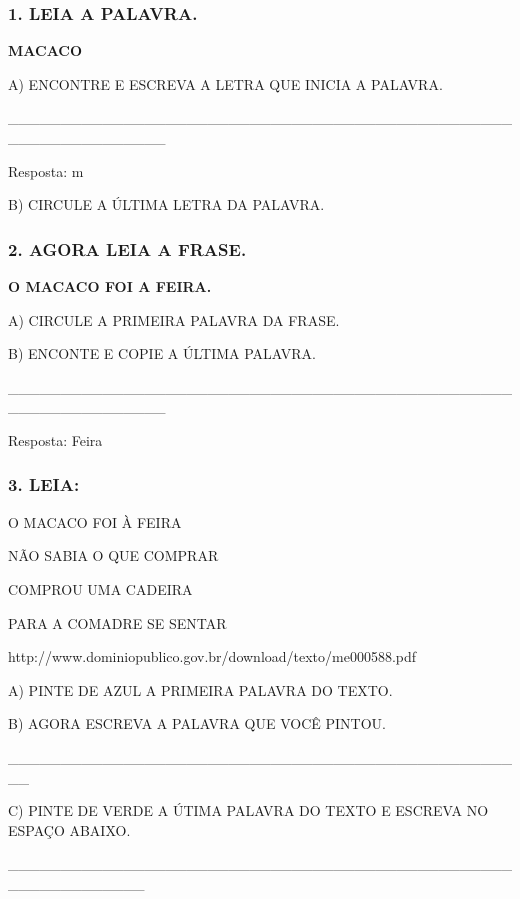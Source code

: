 \subsubsection{1. LEIA A PALAVRA.}\label{leia-a-palavra.}

\textbf{MACACO}

A) ENCONTRE E ESCREVA A LETRA QUE INICIA A PALAVRA.

\_\_\_\_\_\_\_\_\_\_\_\_\_\_\_\_\_\_\_\_\_\_\_\_\_\_\_\_\_\_\_\_\_\_\_\_\_\_\_\_\_\_\_\_\_\_\_\_\_\_\_\_\_\_\_\_\_\_\_\_\_\_\_

Resposta: m

B) CIRCULE A ÚLTIMA LETRA DA PALAVRA.

\subsubsection{2. AGORA LEIA A FRASE.}\label{agora-leia-a-frase.}

\textbf{O MACACO FOI A FEIRA.}

A) CIRCULE A PRIMEIRA PALAVRA DA FRASE.

B) ENCONTE E COPIE A ÚLTIMA PALAVRA.

\_\_\_\_\_\_\_\_\_\_\_\_\_\_\_\_\_\_\_\_\_\_\_\_\_\_\_\_\_\_\_\_\_\_\_\_\_\_\_\_\_\_\_\_\_\_\_\_\_\_\_\_\_\_\_\_\_\_\_\_\_\_\_

Resposta: Feira

\subsubsection{3. LEIA:}\label{leia}

O MACACO FOI À FEIRA

NÃO SABIA O QUE COMPRAR

COMPROU UMA CADEIRA

PARA A COMADRE SE SENTAR

\protect\hypertarget{_heading=h.17dp8vu}{}{}http://www.dominiopublico.gov.br/download/texto/me000588.pdf

A) PINTE DE AZUL A PRIMEIRA PALAVRA DO TEXTO.

B) AGORA ESCREVA A PALAVRA QUE VOCÊ PINTOU.

\_\_\_\_\_\_\_\_\_\_\_\_\_\_\_\_\_\_\_\_\_\_\_\_\_\_\_\_\_\_\_\_\_\_\_\_\_\_\_\_\_\_\_\_\_\_\_\_\_\_

C) PINTE DE VERDE A ÚTIMA PALAVRA DO TEXTO E ESCREVA NO ESPAÇO ABAIXO.

\_\_\_\_\_\_\_\_\_\_\_\_\_\_\_\_\_\_\_\_\_\_\_\_\_\_\_\_\_\_\_\_\_\_\_\_\_\_\_\_\_\_\_\_\_\_\_\_\_\_\_\_\_\_\_\_\_\_\_\_\_

